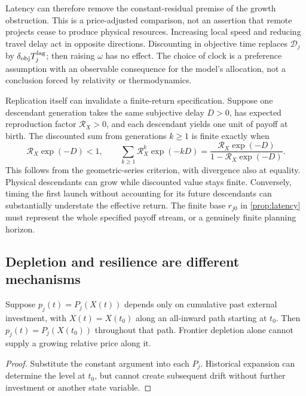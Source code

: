 Latency can therefore remove the constant-residual premise of the growth
obstruction. This is a price-adjusted comparison, not an assertion that
remote projects cease to produce physical resources. Increasing local
speed and reducing travel delay act in opposite directions. Discounting
in objective time replaces $\mathcal D_j$ by $\delta_{\rm obj}T_j^{\rm lag}$;
then raising $\omega$ has no effect. The choice of clock is a preference
assumption with an observable consequence for the model's allocation,
not a conclusion forced by relativity or thermodynamics.

Replication itself can invalidate a finite-return specification. Suppose
one descendant generation takes the same subjective delay $D>0$, has
expected reproduction factor $\mathcal R_X>0$, and each descendant yields
one unit of payoff at birth. The discounted sum from generations
$k\geq1$ is finite exactly when
\begin{equation}
 \mathcal R_X\exp(-D)<1,
 \qquad \sum_{k\geq1}\mathcal R_X^k\exp(-kD)
       =\frac{\mathcal R_X\exp(-D)}{1-\mathcal R_X\exp(-D)}.
 \label{eq:discounted-replication}
\end{equation}
This follows from the geometric-series criterion, with divergence also
at equality. Physical descendants can grow while discounted value stays
finite. Conversely, timing the first launch without accounting for its
future descendants can substantially understate the effective return.
The finite base $r_{j0}$ in \cref{prop:latency} must represent the whole
specified payoff stream, or a genuinely finite planning horizon.

\subsection{Depletion and resilience are different mechanisms}
\begin{proposition}
\label{prop:depletion}
Suppose $p_j(t)=P_j(X(t))$ depends only on cumulative past external
investment, with $X(t)=X(t_0)$ along an all-inward path starting at $t_0$.
Then $p_j(t)=P_j(X(t_0))$ throughout that path. Frontier depletion alone
cannot supply a growing relative price along it.
\end{proposition}
\begin{proof}
Substitute the constant argument into each $P_j$. Historical expansion
can determine the level at $t_0$, but cannot create subsequent drift
without further investment or another state variable.
\end{proof}

